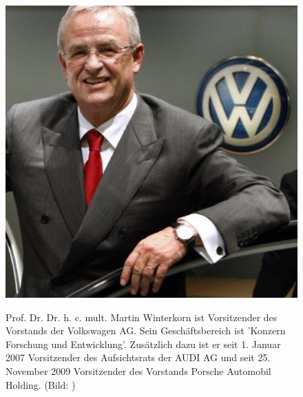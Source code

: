 \documentclass[12pt]{article}
\begin{document}
\begin{figure}[here!]
	\centering
	\begin{minipage}[h]{0.20\textwidth}
		\centering
		\includegraphics[width=1.0\textwidth]{images/MartinWinterkorn.jpg}
		\label{fig:vorstandvw0}
	\end{minipage}
		\begin{minipage}[h]{0.10\textwidth}
		\hspace{1cm} 
	\end{minipage}
	\begin{minipage}[h]{0.65\textwidth}
		Prof. Dr. Dr. h. c. mult. Martin Winterkorn ist Vorsitzender des Vorstands der Volkswagen AG. Sein Geschäftsbereich ist 'Konzern Forschung und Entwicklung'. Zusätzlich dazu ist er seit 1. Januar 2007 Vorsitzender des Aufsichtsrats der AUDI AG und seit 25. November 2009 Vorsitzender des Vorstands Porsche Automobil Holding. 		(Bild: \cite{mwpic} )

	\end{minipage}
\end{figure}\FloatBarrier\noindent
\end{document}
